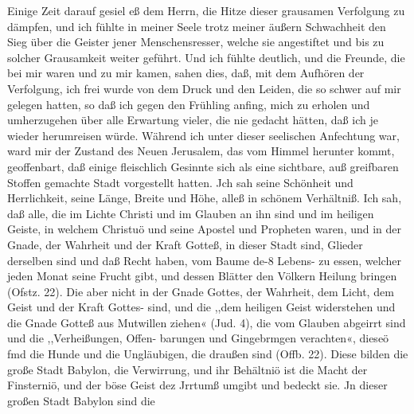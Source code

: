 Einige Zeit darauf gesiel eß dem Herrn, die Hitze dieser
grausamen Verfolgung zu dämpfen, und ich fühlte in meiner
Seele trotz meiner äußern Schwachheit den Sieg über die Geister
jener Menschensresser, welche sie angestiftet und bis zu solcher
Grausamkeit weiter geführt. Und ich fühlte deutlich, und die
Freunde, die bei mir waren und zu mir kamen, sahen dies, daß,
mit dem Aufhören der Verfolgung, ich frei wurde von dem Druck
und den Leiden, die so schwer auf mir gelegen hatten, so daß ich
gegen den Frühling anfing, mich zu erholen und umherzugehen
über alle Erwartung vieler, die nie gedacht hätten, daß ich je
wieder herumreisen würde.
Während ich unter dieser seelischen Anfechtung war, ward
mir der Zustand des Neuen Jerusalem, das vom Himmel herunter
kommt, geoffenbart, daß einige fleischlich Gesinnte sich als eine
sichtbare, auß greifbaren Stoffen gemachte Stadt vorgestellt hatten.
Jch sah seine Schönheit und Herrlichkeit, seine Länge, Breite und
Höhe, alleß in schönem Verhältniß. Ich sah, daß alle, die im
Lichte Christi und im Glauben an ihn sind und im heiligen
Geiste, in welchem Christuö und seine Apostel und Propheten
waren, und in der Gnade, der Wahrheit und der Kraft Gotteß,
in dieser Stadt sind, Glieder derselben sind und daß Recht haben,
vom Baume de-8 Lebens- zu essen, welcher jeden Monat seine Frucht
gibt, und dessen Blätter den Völkern Heilung bringen (Ofstz. 22).
Die aber nicht in der Gnade Gottes, der Wahrheit, dem Licht,
dem Geist und der Kraft Gottes- sind, und die ,,dem heiligen Geist
widerstehen und die Gnade Gotteß aus Mutwillen ziehen« (Jud. 4),
die vom Glauben abgeirrt sind und die ,,Verheißungen, Offen-
barungen und Gingebrmgen verachten«, dieseö fmd die Hunde
und die Ungläubigen, die draußen sind (Offb. 22). Diese bilden
die große Stadt Babylon, die Verwirrung, und ihr Behältniö ist
die Macht der Finsterniö, und der böse Geist dez Jrrtumß umgibt
und bedeckt sie. Jn dieser großen Stadt Babylon sind die


